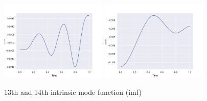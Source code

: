 \documentclass[11pt, oneside]{article}   	%
\begin{document}
\begin{flushleft}
\begin{figure}[H] %
   \centering
   \includegraphics[width=2in]{imf/imf13.png} 
     \includegraphics[width=2in]{imf/imf14.png} 
   \caption{13th and 14th intrinsic mode function (imf)}
   \label{fig:imf1314}
\end{figure}

\end{flushleft}

%
\end{document}
